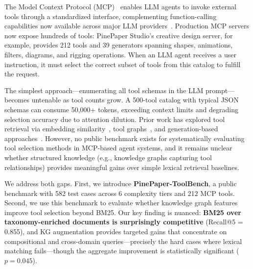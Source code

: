 \documentclass[11pt,a4paper]{article}
\begin{document}
The Model Context Protocol (MCP)~\citep{mcp2024} enables LLM agents to invoke external tools through a standardized interface, complementing function-calling capabilities now available across major LLM providers~\citep{openai2024function}. Production MCP servers now expose hundreds of tools: PinePaper Studio's creative design server, for example, provides 212 tools and 39 generators spanning shapes, animations, filters, diagrams, and rigging operations. When an LLM agent receives a user instruction, it must select the correct subset of tools from this catalog to fulfill the request.

The simplest approach---enumerating all tool schemas in the LLM prompt---becomes untenable as tool counts grow. A 500-tool catalog with typical JSON schemas can consume 50,000+ tokens, exceeding context limits and degrading selection accuracy due to attention dilution. Prior work has explored tool retrieval via embedding similarity~\citep{patil2023gorilla}, tool graphs~\citep{qu2024toolnet}, and generation-based approaches~\citep{yang2024toolgen}. However, no public benchmark exists for systematically evaluating tool selection methods in MCP-based agent systems, and it remains unclear whether structured knowledge (e.g., knowledge graphs capturing tool relationships) provides meaningful gains over simple lexical retrieval baselines.

We address both gaps. First, we introduce \textbf{PinePaper-ToolBench}, a public benchmark with 582 test cases across 6 complexity tiers and 212 MCP tools. Second, we use this benchmark to evaluate whether knowledge graph features improve tool selection beyond BM25. Our key finding is nuanced: \textbf{BM25 over taxonomy-enriched documents is surprisingly competitive} (Recall@5 = 0.855), and KG augmentation provides targeted gains that concentrate on compositional and cross-domain queries---precisely the hard cases where lexical matching fails---though the aggregate improvement is statistically significant ($p=0.045$).
\end{document}
